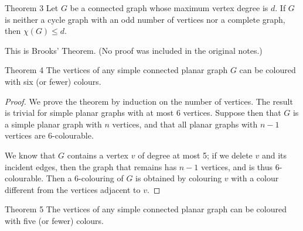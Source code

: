 \begin{thmbox}{Theorem 3}
Let $G$ be a connected graph whose maximum vertex degree is $d$. If $G$ is neither a cycle graph with an odd number of vertices nor a complete graph, then $\chi(G) \leq d$.
\end{thmbox}

\begin{remark}
This is Brooks' Theorem. (No proof was included in the original notes.)
\end{remark}

\begin{thmbox}{Theorem 4}
The vertices of any simple connected planar graph $G$ can be coloured with six (or fewer) colours.
\end{thmbox}

\begin{proof}
We prove the theorem by induction on the number of vertices. The result is trivial for simple planar graphs with at most 6 vertices. Suppose then that $G$ is a simple planar graph with $n$ vertices, and that all planar graphs with $n-1$ vertices are 6-colourable.

We know that $G$ contains a vertex $v$ of degree at most 5; if we delete $v$ and its incident edges, then the graph that remains has $n-1$ vertices, and is thus 6-colourable. Then a 6-colouring of $G$ is obtained by colouring $v$ with a colour different from the vertices adjacent to $v$.
\end{proof}

\begin{thmbox}{Theorem 5}
The vertices of any simple connected planar graph can be coloured with five (or fewer) colours.
\end{thmbox}


